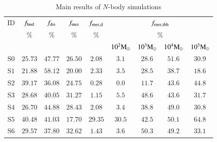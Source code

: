 \documentclass[article]{aa}
\newcommand{\Ms}{{\rm M}_\odot}
\begin{document}
\begin{table}
\caption{Main results of $N$-body simulations}
\label{tab:mergers}
\begin{center}
\begin{tabular}{c|cccc|cccc}
\hline
\hline
ID   & $f_{\rm bnd}$ & $f_{\rm dis}$ & $f_{\rm mer}$ & $f_{\rm mer,d}$ & \multicolumn{4}{c}{$f_{\rm mer,ibh}$} \\
     & $\%$          & $\%$          & $\%$         & $\%$          & \multicolumn{4}{c}{$\%$}\\
     &               &               &              &               &$10^2\Ms$&$10^3\Ms$&$10^4\Ms$&$10^5\Ms$\\
\hline
S$0$ & $25.73$ & $47.77$ & $26.50$ & $2.08$ & $3.1 $ & $28.6 $ & $51.6 $ & $30.9 $ \\ 
S$1$ & $21.88$ & $58.12$ & $20.00$ & $2.33$ & $3.5 $ & $28.5 $ & $38.7 $ & $18.6 $ \\ 
S$2$ & $39.17$ & $36.08$ & $24.75$ & $0.28$ & $0.0 $ & $11.7 $ & $43.6 $ & $44.8 $ \\ 
S$3$ & $28.68$ & $40.05$ & $31.27$ & $1.15$ & $5.5 $ & $48.6 $ & $43.6 $ & $31.7 $ \\ 
S$4$ & $26.70$ & $44.88$ & $28.43$ & $2.08$ & $3.4 $ & $38.8 $ & $49.0 $ & $30.8 $ \\ 
S$5$ & $40.48$ & $41.03$ & $17.70$ & $29.35$& $30.5 $ & $42.5 $ & $50.1 $ & $64.8 $ \\ 
S$6$ & $29.57$ & $37.80$ & $32.62$ & $1.43$ & $3.6 $ & $50.3 $ & $49.2 $ & $33.1 $ \\ 
\hline
\end{tabular}
\label{tab:t2}
\end{center}
\end{table}
\end{document}
